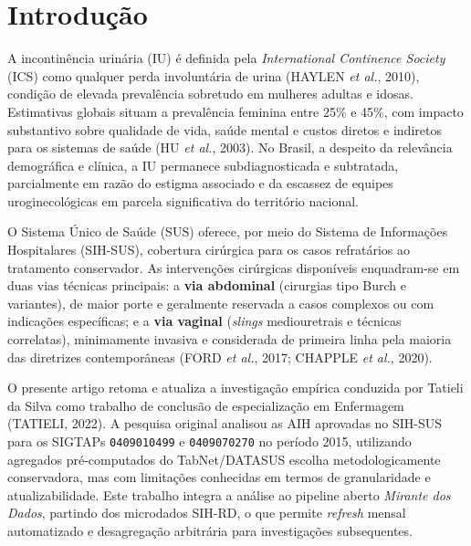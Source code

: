 \documentclass[12pt,a4paper,oneside]{article}
\begin{document}
\newpage

\section{Introdução}\label{sec:intro}

A incontinência urinária (IU) é definida pela \textit{International
Continence Society} (ICS) como qualquer perda involuntária de urina
(HAYLEN \textit{et al.}, 2010), condição de elevada prevalência sobretudo
em mulheres adultas e idosas. Estimativas globais situam a prevalência
feminina entre 25\% e 45\%, com impacto substantivo sobre qualidade de
vida, saúde mental e custos diretos e indiretos para os sistemas de
saúde (HU \textit{et al.}, 2003). No Brasil, a despeito da relevância
demográfica e clínica, a IU permanece subdiagnosticada e subtratada,
parcialmente em razão do estigma associado e da escassez de equipes
uroginecológicas em parcela significativa do território nacional.

O Sistema Único de Saúde (SUS) oferece, por meio do Sistema de
Informações Hospitalares (SIH-SUS), cobertura cirúrgica para os casos
refratários ao tratamento conservador. As intervenções cirúrgicas
disponíveis enquadram-se em duas vias técnicas principais: a
\textbf{via abdominal} (cirurgias tipo Burch e variantes), de maior
porte e geralmente reservada a casos complexos ou com indicações
específicas; e a \textbf{via vaginal} (\textit{slings} mediouretrais e
técnicas correlatas), minimamente invasiva e considerada de primeira
linha pela maioria das diretrizes contemporâneas (FORD
\textit{et al.}, 2017; CHAPPLE \textit{et al.}, 2020).

O presente artigo retoma e atualiza a investigação empírica conduzida
por Tatieli da Silva como trabalho de conclusão de especialização em
Enfermagem (TATIELI, 2022). A pesquisa original analisou as AIH
aprovadas no SIH-SUS para os SIGTAPs \texttt{0409010499} e
\texttt{0409070270} no período 2015, utilizando
agregados pré-computados do TabNet/DATASUS \textemdash{} escolha
metodologicamente conservadora, mas com limitações conhecidas em
termos de granularidade e atualizabilidade. Este trabalho integra a
análise ao pipeline aberto \textit{Mirante dos Dados}, partindo dos
microdados SIH-RD, o que permite \textit{refresh} mensal automatizado
e desagregação arbitrária para investigações subsequentes.
\end{document}
